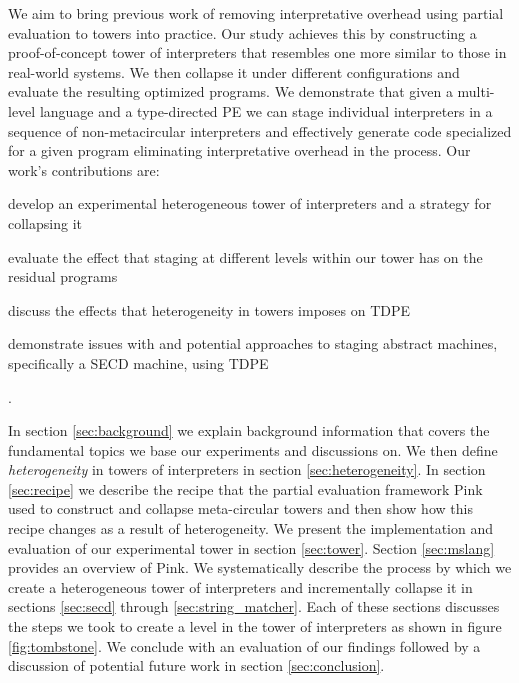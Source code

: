 \documentclass[a4paper,12pt,twoside,openright]{report}
\theoremstyle{definition}
\begin{document}
We aim to bring previous work of removing interpretative overhead using partial evaluation to towers into practice. Our study achieves this by constructing a proof-of-concept tower of interpreters that resembles one more similar to those in real-world systems. We then collapse it under different configurations and evaluate the resulting optimized programs. We demonstrate that given a multi-level language and a type-directed PE we can stage individual interpreters in a sequence of non-metacircular interpreters and effectively generate code specialized for a given program eliminating interpretative overhead in the process. Our work's contributions are:
\begin{enumerate*}[label=(\arabic*)]
	\item develop an experimental heterogeneous tower of interpreters and a strategy for collapsing it
	\item evaluate the effect that staging at different levels within our tower has on the residual programs
	\item discuss the effects that heterogeneity in towers imposes on TDPE
	\item demonstrate issues with and potential approaches to staging abstract machines, specifically a SECD machine, using TDPE
\end{enumerate*}.

In section \ref{sec:background} we explain background information that covers the fundamental topics we base our experiments and discussions on. We then define \textit{heterogeneity} in towers of interpreters in section \ref{sec:heterogeneity}. In section \ref{sec:recipe} we describe the recipe that the partial evaluation framework Pink \cite{amin2017collapsing} used to construct and collapse meta-circular towers and then show how this recipe changes as a result of heterogeneity. We present the implementation and evaluation of our experimental tower in section \ref{sec:tower}. Section \ref{sec:mslang} provides an overview of Pink. We systematically describe the process by which we create a heterogeneous tower of interpreters and incrementally collapse it in sections \ref{sec:secd} through \ref{sec:string_matcher}. Each of these sections discusses the steps we took to create a level in the tower of interpreters as shown in figure \ref{fig:tombstone}. We conclude with an evaluation of our findings followed by a discussion of potential future work in section \ref{sec:conclusion}.
\end{document}
